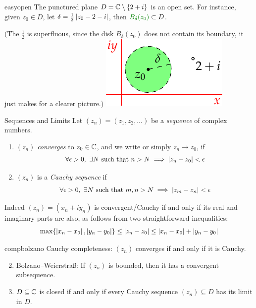 \begin{example}[lower separated=false, sidebyside, sidebyside align=top seam, sidebyside gap=0pt, righthand width=0.3\linewidth]{}{easyopen}
	The punctured plane $D=\mathbb{C}\setminus\{2+i\}$ is an open set. For instance, given $z_0\in D$, let $\delta=\frac 12\left| z_0-2-i\right|$, then $\textcolor{Green}{B_\delta(z_0)}\subset D$.\par
	(The $\frac 12$ is superfluous, since the disk $B_\delta(z_0)$ does not contain its boundary, it just makes for a clearer picture.)
	\tcblower
	\flushright
	\includegraphics[scale=0.95]{limits-punctured}
\end{example}

\begin{defn}{Sequences and Limits}{}{}
	Let $(z_n)=(z_1,z_2,\ldots)$ be a \emph{sequence} of complex numbers.
	\begin{enumerate}\itemsep0pt
	  \item $(z_n)$ \emph{converges} to $z_0\in\mathbb{C}$, and we write  or simply $z_n\to z_0$, if\vspace{-2pt}
		\[
			\forall \epsilon>0,\ \exists N\text{ such that }n>N\implies \left| z_n-z_0\right|<\epsilon
		\]
		\vspace{-20pt}
		
		\item $(z_n)$ is a \emph{Cauchy sequence} if\vspace{-2pt}
		\[
			\forall \epsilon>0,\ \exists N\text{ such that }m,n>N\implies \left| z_m-z_n\right|<\epsilon
		\]
	\end{enumerate}
\end{defn}

Indeed $(z_n)=(x_n+iy_n)$ is convergent/Cauchy if and only if its real and imaginary parts are also, as follows from two straightforward inequalities:
\[
	\max\{\left| x_n-x_0\right|,\left| y_n-y_0\right| \} \le \left| z_n-z_0\right| \le \left| x_n-x_0\right|+\left| y_n-y_0\right|
\]


\begin{thm}{}{compbolzano}
	\exstart Cauchy completeness: $(z_n)$ converges if and only if it is Cauchy.\vspace{-2pt}
	\begin{enumerate}\setcounter{enumi}{1}\itemsep1pt
	  \item Bolzano--Weierstraß: If $(z_n)$ is bounded, then it has a convergent subsequence.
	  \item\label{thm:closedlimit3} $D\subseteq\mathbb{C}$ is closed if and only if every Cauchy sequence $(z_n)\subseteq D$ has its limit in $D$.
	\end{enumerate}
\end{thm}

